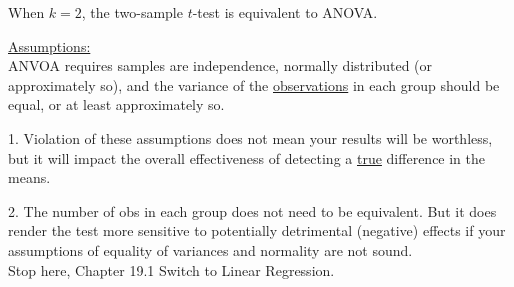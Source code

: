 \documentclass[12pt]{article}
\begin{document}
When $ k = 2 $, the two-sample $ t $-test is equivalent to ANOVA.

{\underline {Assumptions:}}\\
ANVOA requires samples are independence, normally distributed (or
approximately so), and the variance of the {\underline {observations}}
in each group should be equal, or at least approximately so.

1. Violation of these assumptions does not mean your results will be 
worthless, but it will impact the overall effectiveness of detecting
a {\underline {true}} difference in the means.

2. The number of obs in each group does not need to be equivalent.
But it does render the test more sensitive to potentially
detrimental (negative) effects if your assumptions of equality of
variances and normality are not sound.\\



Stop here, Chapter 19.1
Switch to Linear Regression.
\end{document}
